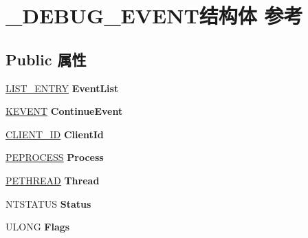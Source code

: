 \hypertarget{struct___d_e_b_u_g___e_v_e_n_t}{}\section{\+\_\+\+D\+E\+B\+U\+G\+\_\+\+E\+V\+E\+N\+T结构体 参考}
\label{struct___d_e_b_u_g___e_v_e_n_t}
\subsection*{Public 属性}
\begin{DoxyCompactItemize}
\item 
\mbox{\label{struct___d_e_b_u_g___e_v_e_n_t_a8285397f1c4bdbc0e4a58169caa32db2}} 
\hyperlink{struct___l_i_s_t___e_n_t_r_y}{L\+I\+S\+T\+\_\+\+E\+N\+T\+RY} {\bfseries Event\+List}
\item 
\mbox{\label{struct___d_e_b_u_g___e_v_e_n_t_aa1784038c43f5211ff89c584ba32e890}} 
\hyperlink{struct___k_e_v_e_n_t}{K\+E\+V\+E\+NT} {\bfseries Continue\+Event}
\item 
\mbox{\label{struct___d_e_b_u_g___e_v_e_n_t_ae9d73364dd56ecb699792a00a2d4bc8d}} 
\hyperlink{struct___c_l_i_e_n_t___i_d}{C\+L\+I\+E\+N\+T\+\_\+\+ID} {\bfseries Client\+Id}
\item 
\mbox{\label{struct___d_e_b_u_g___e_v_e_n_t_a354dd0f505923438952b5b59c4fb8351}} 
\hyperlink{struct___e_p_r_o_c_e_s_s}{P\+E\+P\+R\+O\+C\+E\+SS} {\bfseries Process}
\item 
\mbox{\label{struct___d_e_b_u_g___e_v_e_n_t_a5a2a805c770d98ccef8540c74eb30312}} 
\hyperlink{struct___e_t_h_r_e_a_d}{P\+E\+T\+H\+R\+E\+AD} {\bfseries Thread}
\item 
\mbox{\label{struct___d_e_b_u_g___e_v_e_n_t_a75838693786a95d53300146f44586fcf}} 
N\+T\+S\+T\+A\+T\+US {\bfseries Status}
\item 
\mbox{\label{struct___d_e_b_u_g___e_v_e_n_t_a6740b5e34cdddd10740a055060de1e16}} 
U\+L\+O\+NG {\bfseries Flags}
\item 

\end{DoxyCompactItemize}
